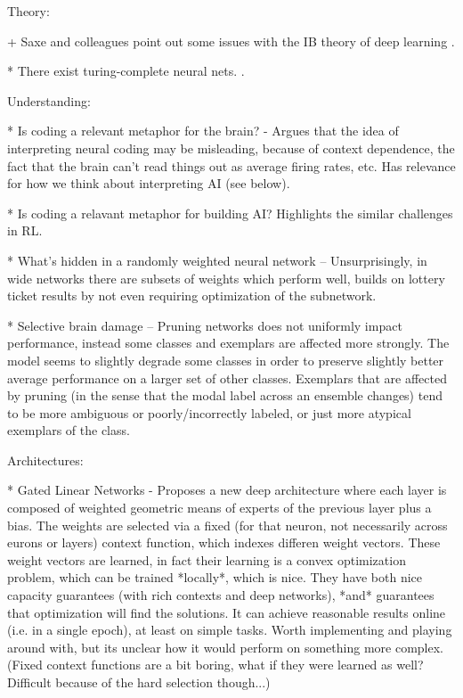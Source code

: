 Theory:

+ Saxe and colleagues point out some issues with the IB theory of deep learning \citep{Saxe2018a}.

* There exist turing-complete neural nets. \citep{Siegelman1992}.


Understanding:

* Is coding a relevant metaphor for the brain? - Argues that the idea of interpreting neural coding may be misleading, because of context dependence, the fact that the brain can't read things out as average firing rates, etc. Has relevance for how we think about interpreting AI (see below). \citep{Brette2019} 

* Is coding a relavant metaphor for building AI? Highlights the similar challenges in RL. \citep{Santoro2019}

* What's hidden in a randomly weighted neural network -- Unsurprisingly, in wide networks there are subsets of weights which perform well, builds on lottery ticket results by not even requiring optimization of the subnetwork. \citep{Ramanujan2019}

* Selective brain damage -- Pruning networks does not uniformly impact performance, instead some classes and exemplars are affected more strongly. The model seems to slightly degrade some classes in order to preserve slightly better average performance on a larger set of other classes. Exemplars that are affected by pruning (in the sense that the modal label across an ensemble changes) tend to be more ambiguous or poorly/incorrectly labeled, or just more atypical exemplars of the class. \citep{Hooker2019}


Architectures:

* Gated Linear Networks - Proposes a new deep architecture where each layer is composed of weighted geometric means of experts of the previous layer plus a bias. The weights are selected via a fixed (for that neuron, not necessarily across eurons or layers) context function, which indexes differen weight vectors. These weight vectors are learned, in fact their learning is a convex optimization problem, which can be trained *locally*, which is nice. They have both nice capacity guarantees (with rich contexts and deep networks), *and* guarantees that optimization will find the solutions. It can achieve reasonable results online (i.e. in a single epoch), at least on simple tasks. Worth implementing and playing around with, but its unclear how it would perform on something more complex. (Fixed context functions are a bit boring, what if they were learned as well? Difficult because of the hard selection though...) \citep{Veness2017} 

